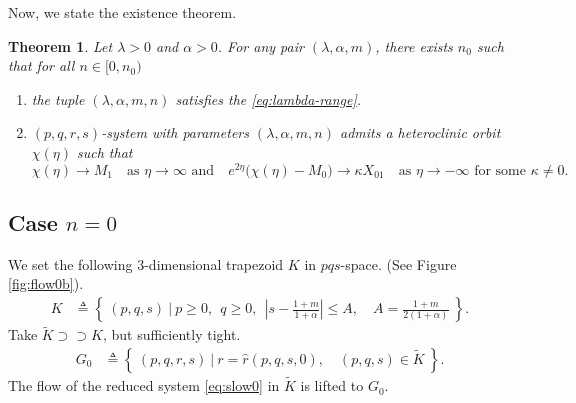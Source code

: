 \documentclass[a4paper,11pt]{article}
\def\blue{\color{blue}}
\newtheorem{theorem}{Theorem}
\begin{document}
{Now, we state the existence theorem.
\begin{theorem} \label{thm1}
Let $\lambda>0$ and $\alpha>0$. For any pair $(\lambda,\alpha,m)$, there exists $n_0$ such that for all $n \in [0,n_0)$
\begin{enumerate}
    \item[(i)] the tuple $(\lambda,\alpha,m,n)$ satisfies the \eqref{eq:lambda-range}.
    \item[(ii)] $(p,q,r,s)$-system with parameters $(\lambda,\alpha,m,n)$ admits a heteroclinic orbit $\chi(\eta)$ such that
    \begin{equation} \label{eq:estimate}
        \chi(\eta) \rightarrow M_1 \quad \text{as $\eta \rightarrow \infty$ and} \quad e^{2\eta}\big(\chi(\eta) - M_0\big) \rightarrow \kappa X_{01} \quad \text{as $\eta \rightarrow -\infty$ for some $\kappa\ne0$}.
    \end{equation}
\end{enumerate}
\end{theorem}


\subsection{Case $n=0$}
We set the following $3$-dimensional trapezoid $K$ in $pqs$-space. (See Figure \ref{fig:flow0b}). %
\begin{align*}
 K &\triangleq \left\{ \: (p,q,s) \: | \:  p\ge0, ~~ q\ge0, ~~ \left|s-\frac{1+m}{1+\alpha}\right| \le A, \quad A=\frac{1+m}{2(1+\alpha)}\: \right\}.%
\end{align*}
Take $\tilde{K} \supset\supset K$, but sufficiently tight.
\begin{align} \label{eq:G0}
 G_0 &\triangleq \left\{ \: (p,q,r,s) \: | \: r=\hat{r}(p,q,s,0), \quad (p,q,s)\in \tilde{K} \: \right\}.
\end{align}
The flow of the reduced system \eqref{eq:slow0} in $\tilde{K}$ is lifted to $G_0$.
% 
% 

}
\end{document}

